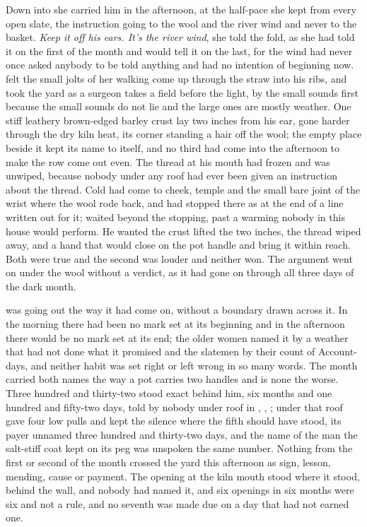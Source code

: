 Down into  she carried him in the afternoon, at the half-pace she kept from every open slate, the instruction going to the wool and the river wind and never to the basket. \emph{Keep it off his ears. It's the river wind}, she told the fold, as she had told it on the first of the month and would tell it on the last, for the wind had never once asked anybody to be told anything and had no intention of beginning now.  felt the small jolts of her walking come up through the straw into his ribs, and took the yard as a surgeon takes a field before the light, by the small sounds first because the small sounds do not lie and the large ones are mostly weather. One stiff leathery brown-edged barley crust lay two inches from his ear, gone harder through the dry kiln heat, its corner standing a hair off the wool; the empty place beside it kept its name to itself, and no third had come into the afternoon to make the row come out even. The thread at his mouth had frozen and was unwiped, because nobody under any roof had ever been given an instruction about the thread. Cold had come to cheek, temple and the small bare joint of the wrist where the wool rode back, and had stopped there as at the end of a line written out for it;  waited beyond the stopping, past a warming nobody in this house would perform. He wanted the crust lifted the two inches, the thread wiped away, and a hand that would close on the pot handle and bring it within reach. Both were true and the second was louder and neither won. The argument went on under the wool without a verdict, as it had gone on through all three days of the dark month.

 was going out the way it had come on, without a boundary drawn across it. In the morning there had been no mark set at its beginning and in the afternoon there would be no mark set at its end; the older women named it by a weather that had not done what it promised and the slatemen by their count of Account-days, and neither habit was set right or left wrong in so many words. The month carried both names the way a pot carries two handles and is none the worse. Three hundred and thirty-two stood exact behind him, six months and one hundred and fifty-two days, told by nobody under  roof in , , ; under that roof  gave four low pulls and kept the silence where the fifth should have stood, its payer unnamed three hundred and thirty-two days, and the name of the man the salt-stiff coat kept on its peg was unspoken the same number. Nothing from the first or second of the month crossed the yard this afternoon as sign, lesson, mending, cause or payment. The opening at the kiln mouth stood where it stood, behind the wall, and nobody had named it, and six openings in six months were six and not a rule, and no seventh was made due on a day that had not earned one.

